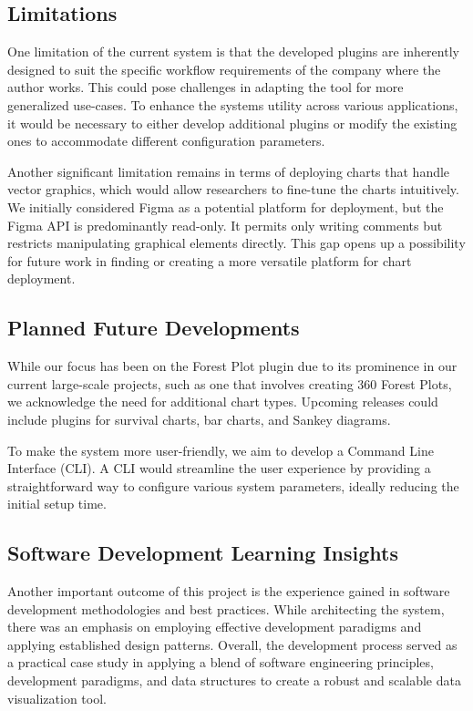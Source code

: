 \subsection{Limitations}\label{limitations}

One limitation of the current system is that the developed plugins are
inherently designed to suit the specific workflow requirements of the
company where the author works. This could pose challenges in adapting
the tool for more generalized use-cases. To enhance the
system\textquotesingle s utility across various applications, it would
be necessary to either develop additional plugins or modify the existing
ones to accommodate different configuration parameters.

Another significant limitation remains in terms of deploying charts that
handle vector graphics, which would allow researchers to fine-tune the
charts intuitively. We initially considered Figma as a potential
platform for deployment, but the Figma API is predominantly read-only.
It permits only writing comments but restricts manipulating graphical
elements directly. This gap opens up a possibility for future work in
finding or creating a more versatile platform for chart deployment.

\subsection{Planned Future
Developments}\label{planned-future-developments}

While our focus has been on the Forest Plot plugin due to its prominence
in our current large-scale projects, such as one that involves creating
360 Forest Plots, we acknowledge the need for additional chart types.
Upcoming releases could include plugins for survival charts, bar charts,
and Sankey diagrams.

To make the system more user-friendly, we aim to develop a Command Line
Interface (CLI). A CLI would streamline the user experience by providing
a straightforward way to configure various system parameters, ideally
reducing the initial setup time.

\subsection{Software Development Learning
Insights}\label{software-development-learning-insights}

Another important outcome of this project is the experience gained in
software development methodologies and best practices. While
architecting the system, there was an emphasis on employing effective
development paradigms and applying established design patterns. Overall,
the development process served as a practical case study in applying a
blend of software engineering principles, development paradigms, and
data structures to create a robust and scalable data visualization tool.
